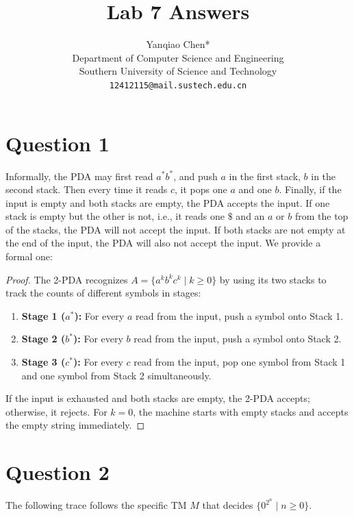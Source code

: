 \documentclass[a4paper, UTF-8]{article}
\theoremstyle{plain}
\begin{document}
\title{\bf{Lab 7 Answers}}
\author{Yanqiao Chen*\\ 
  Department of Computer Science and Engineering\\
  Southern University of Science and Technology\\
  \texttt{12412115@mail.sustech.edu.cn}
  }
\maketitle

\section{Question 1} 

Informally, the PDA may first read $a^*b^*$, and push $a$ in the first stack, $b$ in the second stack. Then every time it reads $c$, it pops one $a$ and one $b$. Finally, if the input is empty and both stacks are empty, the PDA accepts the input. If one stack is empty but the other is not, i.e., it reads one $\mathdollar$ and an $a$ or $b$ from the top of the stacks, the PDA will not accept the input. If both stacks are not empty at the end of the input, the PDA will also not accept the input. We provide a formal one: 

\begin{proof} 
The 2-PDA recognizes $A = \{a^k b^k c^k \mid k \ge 0\}$ by using its two stacks to track the counts of different symbols in stages:
\begin{enumerate}
    \item \textbf{Stage 1 ($a^*$):} For every $a$ read from the input, push a symbol onto Stack 1.
    \item \textbf{Stage 2 ($b^*$):} For every $b$ read from the input, push a symbol onto Stack 2.
    \item \textbf{Stage 3 ($c^*$):} For every $c$ read from the input, pop one symbol from Stack 1 and one symbol from Stack 2 simultaneously.
\end{enumerate}
If the input is exhausted and both stacks are empty, the 2-PDA accepts; otherwise, it rejects. For $k=0$, the machine starts with empty stacks and accepts the empty string immediately.
\end{proof}

\section{Question 2}
The following trace follows the specific TM $M$ that decides $\{0^{2^n} \mid n \ge 0\}$.
\end{document}
